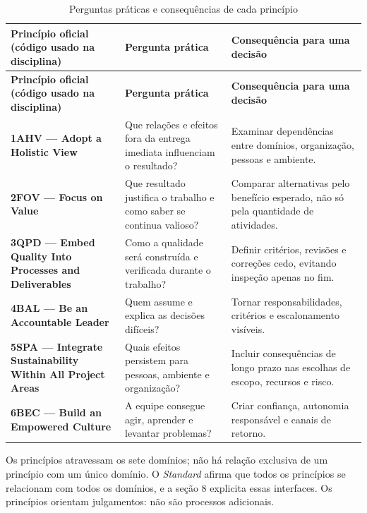 \documentclass[11pt,a4paper]{article}
\makeatletter
\newcommand{\refnum}[1]{\csname refnum@#1\endcsname}
\newcommand{\cit}[1]{[\refnum{#1}]}
\newcommand{\SingleSpacing}{}
\newcommand{\fontetab}[1]{\par\vspace{3pt}{\small\noindent Fonte: #1\par}}
\makeatother
\begin{document}
\begingroup\SingleSpacing\small
\begin{longtable}{@{}>{\raggedright\arraybackslash}p{}>{\raggedright\arraybackslash}p{}>{\raggedright\arraybackslash}p{}@{}}
\caption{Perguntas práticas e consequências de cada princípio}\label{tab:t3}\\
\toprule
\textbf{Princípio oficial (código usado na disciplina)} & \textbf{Pergunta prática} & \textbf{Consequência para uma decisão}\\
\midrule
\endfirsthead
\toprule
\textbf{Princípio oficial (código usado na disciplina)} & \textbf{Pergunta prática} & \textbf{Consequência para uma decisão}\\
\midrule
\endhead
\bottomrule
\endfoot
\bottomrule
\endlastfoot
\textbf{1AHV — Adopt a Holistic View} & Que relações e efeitos fora da entrega imediata influenciam o resultado? & Examinar dependências entre domínios, organização, pessoas e ambiente.\\[3pt]
\textbf{2FOV — Focus on Value} & Que resultado justifica o trabalho e como saber se continua valioso? & Comparar alternativas pelo benefício esperado, não só pela quantidade de atividades.\\[3pt]
\textbf{3QPD — Embed Quality Into Processes and Deliverables} & Como a qualidade será construída e verificada durante o trabalho? & Definir critérios, revisões e correções cedo, evitando inspeção apenas no fim.\\[3pt]
\textbf{4BAL — Be an Accountable Leader} & Quem assume e explica as decisões difíceis? & Tornar responsabilidades, critérios e escalonamento visíveis.\\[3pt]
\textbf{5SPA — Integrate Sustainability Within All Project Areas} & Quais efeitos persistem para pessoas, ambiente e organização? & Incluir consequências de longo prazo nas escolhas de escopo, recursos e risco.\\[3pt]
\textbf{6BEC — Build an Empowered Culture} & A equipe consegue agir, aprender e levantar problemas? & Criar confiança, autonomia responsável e canais de retorno.\\[3pt]
\end{longtable}
\endgroup
\fontetab{Elaborado pelos autores (2026), com base em \cit{pmi}.}

Os princípios atravessam os sete domínios; não há relação exclusiva de um princípio com um único domínio. O \textit{Standard} afirma que todos os princípios se relacionam com todos os domínios, e a seção 8 explicita essas interfaces. Os princípios orientam julgamentos: não são processos adicionais.
\end{document}
